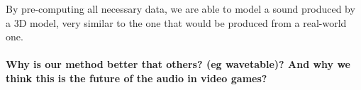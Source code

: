 By pre-computing all necessary data, we are able to model a sound produced by a 3D model, very similar to the one that would be produced from a real-world one.

\paragraph{Why is our method better that others? (eg wavetable)? And why we think this is the future of the audio in video games?\\}
  



